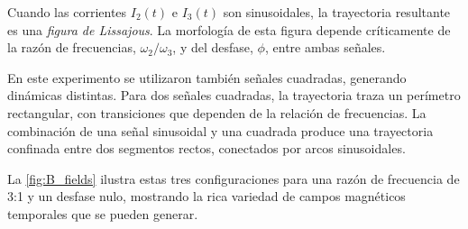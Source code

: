Cuando las corrientes $I_2(t)$ e $I_3(t)$ son sinusoidales, la
trayectoria resultante es una \emph{figura de Lissajous}. La morfología de
esta figura depende críticamente de la razón de frecuencias,
$\omega_2/\omega_3$, y del desfase, $\phi$, entre ambas señales.

En este experimento se utilizaron también señales cuadradas, generando
dinámicas distintas. Para dos señales cuadradas, la trayectoria traza un
perímetro rectangular, con transiciones que dependen de la relación de
frecuencias. La combinación de una señal sinusoidal y una cuadrada
produce una trayectoria confinada entre dos segmentos rectos, conectados
por arcos sinusoidales.

La \cref{fig:B_fields} ilustra estas tres configuraciones para una razón
de frecuencia de 3:1 y un desfase nulo, mostrando la rica variedad de
campos magnéticos temporales que se pueden generar.

